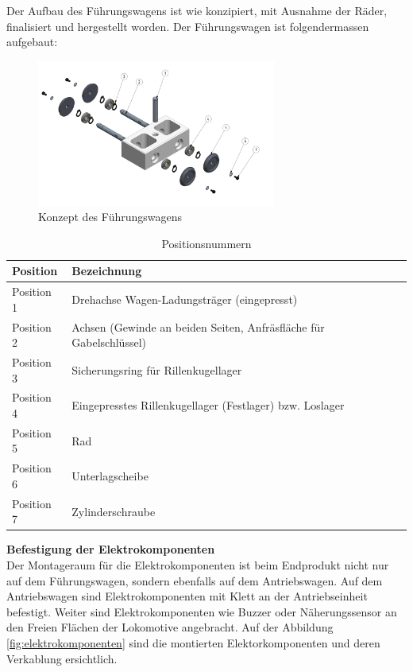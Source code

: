 \documentclass[../../main.tex]{subfiles}
\begin{document}
Der Aufbau des Führungswagens ist wie konzipiert, mit Ausnahme der Räder, finalisiert und hergestellt worden. Der Führungswagen ist folgendermassen aufgebaut:\\

\begin{figure}[H]
  \centering
  \includegraphics[width=0.7\textwidth]{fuehrungswagen.PNG}
  \caption {Konzept des Führungswagens}
  \label{fig:fuehrungswagen2}
\end{figure}

\begin{table}[H] \centering
  \begin{tabular}{|l|l|}
  \hline
  \textbf{Position} & \textbf{Bezeichnung}\\
  \hline
  Position 1          & Drehachse Wagen-Ladungsträger (eingepresst)\\
   \hline
  Position 2          & Achsen (Gewinde an beiden Seiten, Anfräsfläche für Gabelschlüssel)\\
   \hline
  Position 3          & Sicherungsring für Rillenkugellager\\
  \hline
  Position 4          & Eingepresstes Rillenkugellager (Festlager) bzw. Loslager\\
  \hline
  Position 5          & Rad\\
  \hline
  Position 6          & Unterlagscheibe\\
  \hline
  Position 7          & Zylinderschraube\\
  \hline
  \end{tabular}
\caption{Positionsnummern}
\label{tab:expl_antriebswagen}
\end{table} 

\pagebreak

\textbf{Befestigung der Elektrokomponenten}\\
Der Montageraum für die Elektrokomponenten ist beim Endprodukt nicht nur auf dem Führungswagen, sondern ebenfalls auf dem Antriebswagen. Auf dem Antriebswagen sind Elektrokomponenten mit Klett an der Antriebseinheit befestigt. Weiter sind Elektrokomponenten wie Buzzer oder Näherungssensor an den Freien Flächen der Lokomotive angebracht. Auf der Abbildung \ref{fig:elektrokomponenten} sind die montierten Elektorkomponenten und deren Verkablung ersichtlich.\\
\end{document}
